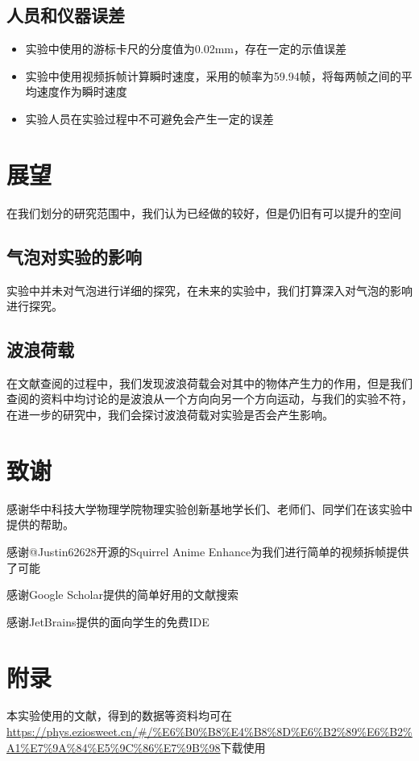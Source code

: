 \documentclass[UTF8]{gapd}
\begin{document}
\subsection{人员和仪器误差}
\begin{itemize}
    \item 实验中使用的游标卡尺的分度值为0.02mm，存在一定的示值误差
    \item 实验中使用视频拆帧计算瞬时速度，采用的帧率为59.94帧，将每两帧之间的平均速度作为瞬时速度
    \item 实验人员在实验过程中不可避免会产生一定的误差
\end{itemize}

\section{展望}
在我们划分的研究范围中，我们认为已经做的较好，但是仍旧有可以提升的空间
\subsection{气泡对实验的影响}
实验中并未对气泡进行详细的探究，在未来的实验中，我们打算深入对气泡的影响进行探究。
\subsection{波浪荷载}
在文献查阅的过程中，我们发现波浪荷载会对其中的物体产生力的作用，但是我们查阅的资料中均讨论的是波浪从一个方向向另一个方向运动，与我们的实验不符，在进一步的研究中，我们会探讨波浪荷载对实验是否会产生影响。
\section*{致谢}
感谢华中科技大学物理学院物理实验创新基地学长们、老师们、同学们在该实验中提供的帮助。

感谢@Justin62628开源的Squirrel Anime Enhance为我们进行简单的视频拆帧提供了可能

感谢Google Scholar提供的简单好用的文献搜索

感谢JetBrains提供的面向学生的免费IDE

\section*{附录}
本实验使用的文献，得到的数据等资料均可在
\url{https://phys.eziosweet.cn/#/%E6%B0%B8%E4%B8%8D%E6%B2%89%E6%B2%A1%E7%9A%84%E5%9C%86%E7%9B%98}下载使用
\end{document}
